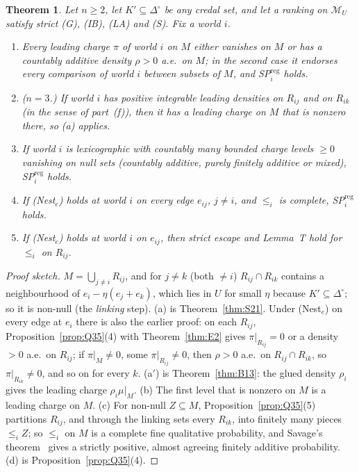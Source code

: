 \documentclass[11pt]{article}
\newtheorem{theorem}{Theorem}[section]
\theoremstyle{definition}
\theoremstyle{remark}
\newcommand{\Di}{\Delta^{\circ}}
\newcommand{\M}{\mathcal M}
\begin{document}
\begin{theorem}\label{thm:Q36}
Let $n\ge2$, let $K'\subseteq\Di$ be any credal set, and let a ranking on $\M_U$ satisfy strict (G), (IB), (LA) and (S). Fix a world $i$.
\begin{enumerate}[leftmargin=*,label=(\alph*)]
\item Every leading charge $\pi$ of world $i$ on $M$ either vanishes on $M$ or has a countably additive density $\rho>0$ a.e.\ on $M$; in the second case it endorses every comparison of world $i$ between subsets of $M$, and SP$^{\mathrm{reg}}_i$ holds.
\item[(a$'$)] ($n=3$.) If world $i$ has positive integrable leading densities on $R_{ij}$ and on $R_{ik}$ (in the sense of part~(f)), then it has a leading charge on $M$ that is nonzero there, so (a) applies.
\item If world $i$ is lexicographic with countably many bounded charge levels $\ge0$ vanishing on null sets (countably additive, purely finitely additive or mixed), SP$^{\mathrm{reg}}_i$ holds.
\item If (Nest$_e$) holds at world $i$ on every edge $e_{ij}$, $j\ne i$, and $\le_i$ is complete, SP$^{\mathrm{reg}}_i$ holds.
\item If (Nest$_e$) holds at world $i$ on $e_{ij}$, then strict escape and Lemma~T hold for $\le_i$ on $R_{ij}$.
\end{enumerate}
\end{theorem}
\begin{proof}[Proof sketch]
$M=\bigcup_{j\ne i}R_{ij}$, and for $j\ne k$ (both $\ne i$) $R_{ij}\cap R_{ik}$ contains a neighbourhood of $e_i-\eta(e_j+e_k)$, which lies in $U$ for small $\eta$ because $K'\subseteq\Di$; so it is non-null (the \emph{linking} step). (a) is Theorem~\ref{thm:S21}. Under (Nest$_e$) on every edge at $e_i$ there is also the earlier proof: on each $R_{ij}$, Proposition~\ref{prop:Q35}(4) with Theorem~\ref{thm:E2} gives $\pi|_{R_{ij}}=0$ or a density $>0$ a.e.\ on $R_{ij}$; if $\pi|_M\ne0$, some $\pi|_{R_{ij}}\ne0$, then $\rho>0$ a.e.\ on $R_{ij}\cap R_{ik}$, so $\pi|_{R_{ik}}\ne0$, and so on for every $k$. (a$'$) is Theorem~\ref{thm:B13}: the glued density $\rho_i$ gives the leading charge $\rho_i\mu|_M$. (b) The first level that is nonzero on $M$ is a leading charge on $M$. (c) For non-null $Z\subseteq M$, Proposition~\ref{prop:Q35}(5) partitions $R_{ij}$, and through the linking sets every $R_{ik}$, into finitely many pieces $\le_iZ$; so $\le_i$ on $M$ is a complete fine qualitative probability, and Savage's theorem~\cite{Sav1954,Fis1986} gives a strictly positive, almost agreeing finitely additive probability. (d) is Proposition~\ref{prop:Q35}(4).
\end{proof}
\end{document}
